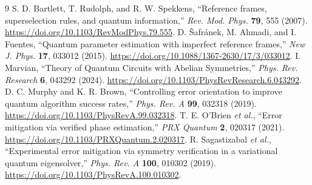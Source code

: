 \documentclass[11pt,a4paper]{article}
\begin{document}
\begin{thebibliography}{9}\small
{} S. D. Bartlett, T. Rudolph, and R. W. Spekkens, ``Reference frames, superselection rules, and quantum information,'' \emph{Rev. Mod. Phys.} \textbf{79}, 555 (2007). \url{https://doi.org/10.1103/RevModPhys.79.555}.
 D. \v{S}afr\'anek, M. Ahmadi, and I. Fuentes, ``Quantum parameter estimation with imperfect reference frames,'' \emph{New J. Phys.} \textbf{17}, 033012 (2015). \url{https://doi.org/10.1088/1367-2630/17/3/033012}.
 I. Marvian, ``Theory of Quantum Circuits with Abelian Symmetries,'' \emph{Phys. Rev. Research} \textbf{6}, 043292 (2024). \url{https://doi.org/10.1103/PhysRevResearch.6.043292}.
 D. C. Murphy and K. R. Brown, ``Controlling error orientation to improve quantum algorithm success rates,'' \emph{Phys. Rev. A} \textbf{99}, 032318 (2019). \url{https://doi.org/10.1103/PhysRevA.99.032318}.
 T. E. O'Brien \emph{et al.}, ``Error mitigation via verified phase estimation,'' \emph{PRX Quantum} \textbf{2}, 020317 (2021). \url{https://doi.org/10.1103/PRXQuantum.2.020317}.
 R. Sagastizabal \emph{et al.}, ``Experimental error mitigation via symmetry verification in a variational quantum eigensolver,'' \emph{Phys. Rev. A} \textbf{100}, 010302 (2019). \url{https://doi.org/10.1103/PhysRevA.100.010302}.
\end{thebibliography}
\end{document}
